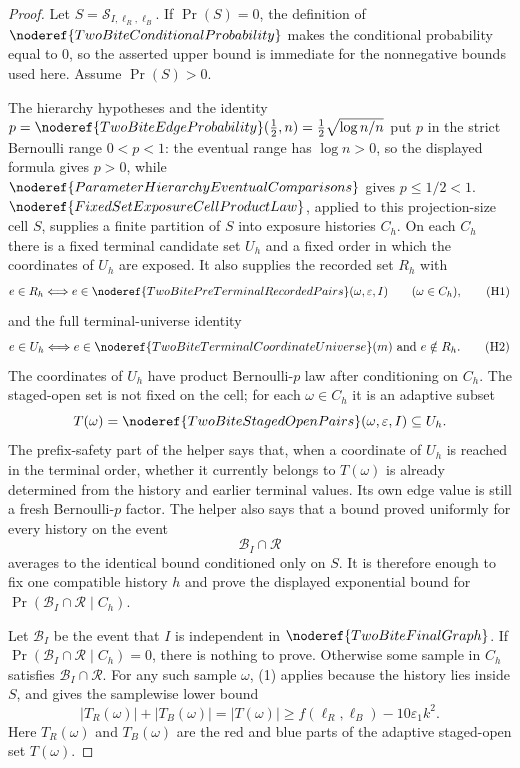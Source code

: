 \begin{proof}
Let \(S=\mathcal S_{I,\ell_R,\ell_B}\).  If \(\Pr(S)=0\), the definition of
\(\noderef{TwoBiteConditionalProbability}\) makes the conditional probability
equal to \(0\), so the asserted upper bound is immediate for the nonnegative
bounds used here.  Assume \(\Pr(S)>0\).

The hierarchy hypotheses and the identity
\(p=\noderef{TwoBiteEdgeProbability}(\frac12,n)
=\frac12\sqrt{\log n/n}\) put \(p\) in the strict Bernoulli range
\(0<p<1\): the eventual range has \(\log n>0\), so the displayed formula
gives \(p>0\), while
\(\noderef{ParameterHierarchyEventualComparisons}\) gives
\(p\le1/2<1\).
\(\noderef{FixedSetExposureCellProductLaw}\), applied to this projection-size
cell \(S\), supplies a finite partition of \(S\) into exposure histories
\(C_h\).  On each \(C_h\) there is a fixed terminal candidate set \(U_h\) and
a fixed order in which the coordinates of \(U_h\) are exposed.  It also
supplies the recorded set \(R_h\) with
\[
e\in R_h
\Longleftrightarrow
e\in\noderef{TwoBitePreTerminalRecordedPairs}(\omega,\varepsilon,I)
\qquad(\omega\in C_h),
\tag{H1}
\]
and the full terminal-universe identity
\[
e\in U_h
\Longleftrightarrow
e\in\noderef{TwoBiteTerminalCoordinateUniverse}(m)\hbox{ and }e\notin R_h.
\tag{H2}
\]
The coordinates of \(U_h\) have product Bernoulli-\(p\) law after
conditioning on \(C_h\).  The staged-open set is not fixed on the cell; for
each
\(\omega\in C_h\) it is an adaptive subset
\[
T(\omega)=\noderef{TwoBiteStagedOpenPairs}(\omega,\varepsilon,I)
        \subseteq U_h.
\]
The prefix-safety part of the helper says that, when a coordinate of \(U_h\)
is reached in the terminal order, whether it currently belongs to
\(T(\omega)\) is already determined from the history and earlier terminal
values.  Its own edge value is still a fresh Bernoulli-\(p\) factor.  The
helper also says that a bound proved uniformly for every history on the event
\[
\mathcal B_I\cap\mathcal R
\]
averages to the identical bound conditioned only on \(S\).  It is therefore
enough to fix one compatible history \(h\) and prove the displayed
exponential bound for
\(\Pr(\mathcal B_I\cap\mathcal R\mid C_h)\).

Let \(\mathcal B_I\) be the event that \(I\) is independent in
\(\noderef{TwoBiteFinalGraph}\).  If
\(\Pr(\mathcal B_I\cap\mathcal R\mid C_h)=0\), there is nothing to prove.
Otherwise some sample in \(C_h\) satisfies \(\mathcal B_I\cap\mathcal R\).
For any such sample \(\omega\), (1) applies because the history lies inside
\(S\), and gives the samplewise lower bound
\[
|T_R(\omega)|+|T_B(\omega)|=|T(\omega)|
\ge f(\ell_R,\ell_B)-10\varepsilon_1k^2. \tag{2}
\]
Here \(T_R(\omega)\) and \(T_B(\omega)\) are the red and blue parts of the
adaptive staged-open set \(T(\omega)\).


\end{proof}
